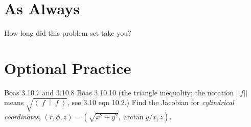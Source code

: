 \documentclass[answers]{exam}\newcommand{\repositoryInformationSetup}{     \usepackage[dvipsnames]{xcolor}     \usepackage[ angle=90, color=black, opacity=1, scale=2, ]{background}      \SetBgPosition{current page.west}      \SetBgVshift{-4.5mm}      \backgroundsetup{contents={{\color{green}\texttt{-{}-} differs from commit \texttt{aac605f} in 0 files}}} } \newcommand{\commit}{{{\color{green}aac605f}}}\usepackage{amsmath}
\newcommand{\bracket}[2]{\ensuremath{\left\langle\;#1\;\middle|\;#2\;\right\rangle}}
\let\braket\bracket
\begin{document}
\begin{questions}
	\clearpage
	\section*{As Always}
	\question How long did this problem set take you?

	\section*{Optional Practice}
	\question Boas 3.10.7 and 3.10.8
	\question Boas 3.10.10 (the triangle inequality; the notation $||f||$ means $\sqrt{\braket{f}{f}}$, see 3.10 eqn 10.2.)
	\question Find the Jacobian for \emph{cylindrical coordinates}, $(r,\phi,z) = (\sqrt{x^2+y^2}, \arctan y/x, z)$.
\end{questions}
\end{document}
